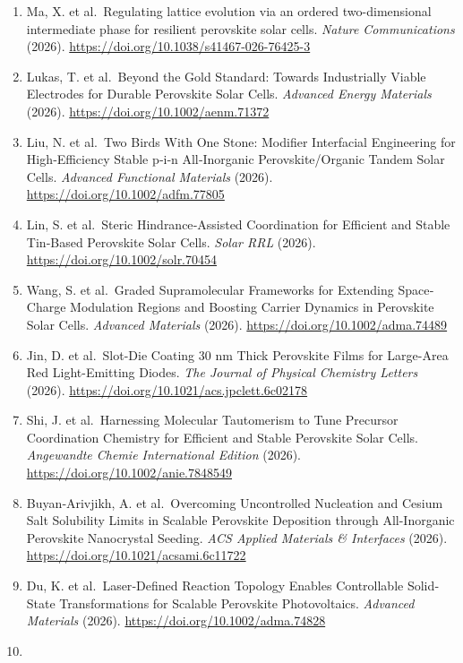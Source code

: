 \documentclass[
  11pt,
]{article}
\begin{document}
\begin{enumerate}
{  International Edition} (2026).
  \url{https://doi.org/10.1002/anie.2425823}
\item
  Ma, X. et al.~Regulating lattice evolution via an ordered
  two-dimensional intermediate phase for resilient perovskite solar
  cells. \emph{Nature Communications} (2026).
  \url{https://doi.org/10.1038/s41467-026-76425-3}
\item
  Lukas, T. et al.~Beyond the Gold Standard: Towards Industrially Viable
  Electrodes for Durable Perovskite Solar Cells. \emph{Advanced Energy
  Materials} (2026). \url{https://doi.org/10.1002/aenm.71372}
\item
  Liu, N. et al.~Two Birds With One Stone: Modifier Interfacial
  Engineering for High‐Efficiency Stable p‐i‐n All‐Inorganic
  Perovskite/Organic Tandem Solar Cells. \emph{Advanced Functional
  Materials} (2026). \url{https://doi.org/10.1002/adfm.77805}
\item
  Lin, S. et al.~Steric Hindrance‐Assisted Coordination for Efficient
  and Stable Tin‐Based Perovskite Solar Cells. \emph{Solar RRL} (2026).
  \url{https://doi.org/10.1002/solr.70454}
\item
  Wang, S. et al.~Graded Supramolecular Frameworks for Extending
  Space‐Charge Modulation Regions and Boosting Carrier Dynamics in
  Perovskite Solar Cells. \emph{Advanced Materials} (2026).
  \url{https://doi.org/10.1002/adma.74489}
\item
  Jin, D. et al.~Slot-Die Coating 30 nm Thick Perovskite Films for
  Large-Area Red Light-Emitting Diodes. \emph{The Journal of Physical
  Chemistry Letters} (2026).
  \url{https://doi.org/10.1021/acs.jpclett.6c02178}
\item
  Shi, J. et al.~Harnessing Molecular Tautomerism to Tune Precursor
  Coordination Chemistry for Efficient and Stable Perovskite Solar
  Cells. \emph{Angewandte Chemie International Edition} (2026).
  \url{https://doi.org/10.1002/anie.7848549}
\item
  Buyan‐Arivjikh, A. et al.~Overcoming Uncontrolled Nucleation and
  Cesium Salt Solubility Limits in Scalable Perovskite Deposition
  through All-Inorganic Perovskite Nanocrystal Seeding. \emph{ACS
  Applied Materials \& Interfaces} (2026).
  \url{https://doi.org/10.1021/acsami.6c11722}
\item
  Du, K. et al.~Laser‐Defined Reaction Topology Enables Controllable
  Solid‐State Transformations for Scalable Perovskite Photovoltaics.
  \emph{Advanced Materials} (2026).
  \url{https://doi.org/10.1002/adma.74828}
\item

\end{enumerate}
\end{document}
